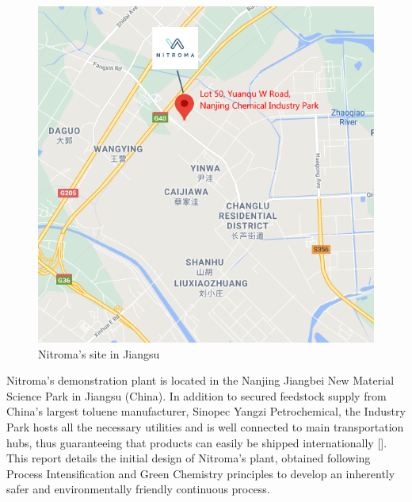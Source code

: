 \begin{figure}
    \centering
    \includegraphics[width=0.2\linewidth]{chapters/0-executive-summary/figures/Location-crop.png}
    \caption{Nitroma's site in Jiangsu}
    \label{fig:location}
\end{figure}
Nitroma's demonstration plant is located in the Nanjing Jiangbei New Material Science Park in Jiangsu (China). In addition to secured feedstock supply from China’s largest toluene manufacturer, Sinopec Yangzi Petrochemical, the Industry Park hosts all the necessary utilities and is well connected to main transportation hubs, thus guaranteeing that products can easily be shipped internationally []. 
This report details the initial design of Nitroma's plant, obtained following Process Intensification and Green Chemistry principles to develop an inherently safer and environmentally friendly continuous process.



